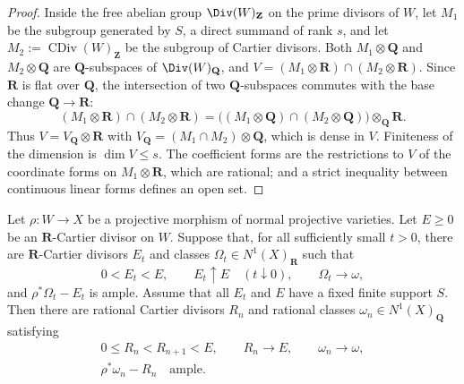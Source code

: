 \begin{proof}
Inside the free abelian group $\Div(W)_{\mathbf Z}$ on the prime divisors
of $W$, let $M_1$ be the subgroup generated by $S$, a direct summand
of rank $s$, and let $M_2:=\operatorname{CDiv}(W)_{\mathbf Z}$ be the
subgroup of Cartier divisors.  Both $M_1\otimes\mathbf Q$ and
$M_2\otimes\mathbf Q$ are $\mathbf Q$-subspaces of
$\Div(W)_{\mathbf Q}$, and $V=(M_1\otimes\mathbf R)\cap
(M_2\otimes\mathbf R)$.  Since $\mathbf R$ is flat over $\mathbf Q$,
the intersection of two $\mathbf Q$-subspaces commutes with the base
change $\mathbf Q\to\mathbf R$:
\[
 (M_1\otimes\mathbf R)\cap(M_2\otimes\mathbf R)
 =\bigl((M_1\otimes\mathbf Q)\cap(M_2\otimes\mathbf Q)\bigr)
   \otimes_{\mathbf Q}\mathbf R .
\]
Thus $V=V_{\mathbf Q}\otimes\mathbf R$ with
$V_{\mathbf Q}=(M_1\cap M_2)\otimes\mathbf Q$, which is dense in
$V$.  Finiteness of the dimension is $\dim V\leq s$.  The coefficient
forms are the restrictions to $V$ of the coordinate forms on
$M_1\otimes\mathbf R$, which are rational; and a strict inequality
between continuous linear forms defines an open set.
\end{proof}

\begin{lemma}\label{lem:bj-ordered-rational-approximation}
Let $\rho:W\to X$ be a projective morphism of normal projective
varieties.  Let $E\ge0$ be an $\mathbf R$-Cartier divisor on $W$.
Suppose that, for all sufficiently small $t>0$, there are
$\mathbf R$-Cartier divisors $E_t$ and classes
$\Omega_t\in N^1(X)_{\mathbf R}$ such that
\[
 0<E_t<E,\qquad
 E_t\uparrow E\quad(t\downarrow0),\qquad
 \Omega_t\longrightarrow\omega,
\tag{38.22}\label{eq:bj-real-buffer-hypotheses}
\]
and $\rho^*\Omega_t-E_t$ is ample.  Assume that all $E_t$ and $E$
have a fixed finite support $S$.  Then there are rational Cartier
divisors $R_n$ and rational classes
$\omega_n\in N^1(X)_{\mathbf Q}$ satisfying
\[
 \begin{gathered}
 0\le R_n<R_{n+1}<E,\qquad
 R_n\longrightarrow E,\qquad
 \omega_n\longrightarrow\omega,\\
                       \rho^*\omega_n-R_n\quad\text{ample}.
 \end{gathered}
\tag{38.23}\label{eq:bj-ordered-rational-approximation}
\]
\end{lemma}

